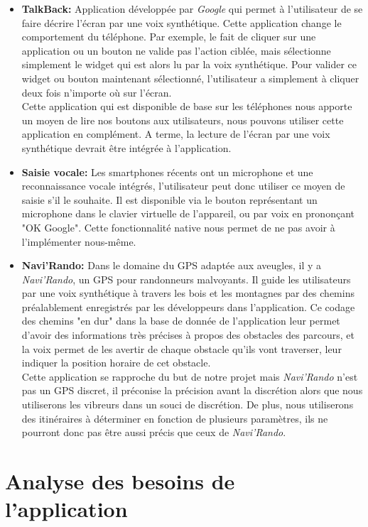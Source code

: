 \begin{itemize}
\item \textbf{TalkBack:} Application développée par \textit{Google} qui permet à l'utilisateur de se faire décrire l'écran par une voix synthétique. Cette application change le comportement du téléphone. Par exemple, le fait de cliquer sur une application ou un bouton ne valide pas l'action ciblée, mais sélectionne simplement le widget qui est alors lu par la voix synthétique. Pour valider ce widget ou bouton maintenant sélectionné, l'utilisateur a simplement à cliquer deux fois n'importe où sur l'écran.\\
Cette application qui est disponible de base sur les téléphones nous apporte un moyen de lire nos boutons aux utilisateurs, nous pouvons utiliser cette application en complément. A terme, la lecture de l'écran par une voix synthétique devrait être intégrée à l'application.
\item \textbf{Saisie vocale:} Les smartphones récents ont un microphone et une reconnaissance vocale intégrés, l'utilisateur peut donc utiliser ce moyen de saisie s'il le souhaite. Il est disponible via le bouton représentant un microphone dans le clavier virtuelle de l'appareil, ou par voix en prononçant "OK Google". Cette fonctionnalité native nous permet de ne pas avoir à l'implémenter nous-même.\\
\item \textbf{Navi'Rando\cite{Navirando}:} Dans le domaine du GPS adaptée aux aveugles, il y a \textit{Navi'Rando}, un GPS pour randonneurs malvoyants. Il guide les utilisateurs par une voix synthétique à travers les bois et les montagnes par des chemins préalablement enregistrés par les développeurs dans l'application. Ce codage des chemins "en dur" dans la base de donnée de l'application leur permet d'avoir des informations très précises à propos des obstacles des parcours, et la voix permet de les avertir de chaque obstacle qu'ils vont traverser, leur indiquer la position horaire de cet obstacle.\\
Cette application se rapproche du but de notre projet mais \textit{Navi'Rando} n'est pas un GPS discret, il préconise la précision avant la discrétion alors que nous utiliserons les vibreurs dans un souci de discrétion. De plus, nous utiliserons des itinéraires à déterminer en fonction de plusieurs paramètres, ils ne pourront donc pas être aussi précis que ceux de \textit{Navi'Rando}.
\end{itemize}

\section{Analyse des besoins de l'application}

